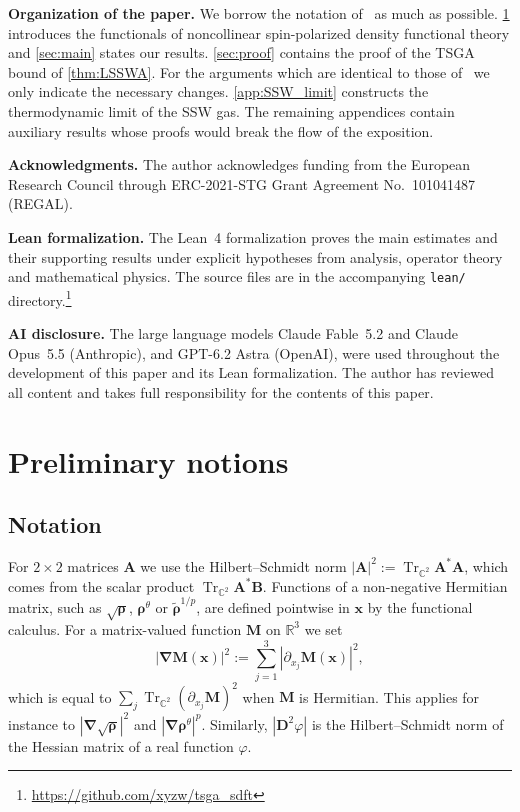 \documentclass[final,reqno]{amsart}
\theoremstyle{remark}
\newcommand{\wt}[1]{\widetilde{#1}}
\DeclareMathOperator{\Tr}{Tr}
\newcommand{\Trs}{\Tr_{\CC^2}}
\newcommand{\RR}{\mathbb{R}}
\newcommand{\CC}{\mathbb{C}}
\newcommand{\grad}{\bm{\nabla}}
\begin{document}
\medskip

\noindent\textbf{Organization of the paper.} We borrow the notation of~\cite{lewin2020local} as much as possible. \cref{sec:Prel} introduces the functionals of noncollinear spin-polarized density functional theory and \cref{sec:main} states our results. \cref{sec:proof} contains the proof of the TSGA bound of \cref{thm:LSSWA}. For the arguments which are identical to those of~\cite{lewin2020local} we only indicate the necessary changes. \cref{app:SSW_limit} constructs the thermodynamic limit of the SSW gas. The remaining appendices contain auxiliary results whose proofs would break the flow of the exposition.

\medskip

\noindent\textbf{Acknowledgments.} The author acknowledges funding from the European Research Council through ERC-2021-STG Grant Agreement No.~101041487 \mbox{(REGAL)}.

\medskip

\noindent\textbf{Lean formalization.} The Lean~4 formalization proves the main estimates and their supporting results under explicit hypotheses from analysis, operator theory and mathematical physics. The source files are in the accompanying \texttt{lean/} directory.\footnote{\url{https://github.com/xyzw/tsga_sdft}}\enlargethispage{2pt}

\medskip

\noindent\textbf{AI disclosure.} The large language models Claude Fable~5.2 and Claude Opus~5.5 (Anthropic), and GPT-6.2 Astra (OpenAI), were used throughout the development of this paper and its Lean formalization. The author has reviewed all content and takes full responsibility for the contents of this paper.

\clearpage
\section{Preliminary notions}\label{sec:Prel}

\subsection{Notation}\label{sec:notation}
For $2\times 2$ matrices $\mathbf{A}$ we use the Hilbert--Schmidt norm $|\mathbf{A}|^2:=\Trs\mathbf{A}^*\mathbf{A}$, which comes from the scalar product $\Trs\mathbf{A}^*\mathbf{B}$. Functions of a non-negative Hermitian matrix, such as $\sqrt{\bm{\rho}}$, $\bm{\rho}^\theta$ or $\wt{\bm{\rho}}^{1/p}$, are defined pointwise in $\mathbf{x}$ by the functional calculus. For a matrix-valued function $\mathbf{M}$ on $\RR^3$ we set
$$
|\grad\mathbf{M}(\mathbf{x})|^2:=\sum_{j=1}^3|\partial_{x_j}\mathbf{M}(\mathbf{x})|^2,
$$
which is equal to $\sum_j\Trs(\partial_{x_j}\mathbf{M})^2$ when $\mathbf{M}$ is Hermitian. This applies for instance to $|\grad\sqrt{\bm{\rho}}|^2$ and $|\grad\bm{\rho}^\theta|^p$. Similarly, $|\mathbf{D}^2\varphi|$ is the Hilbert--Schmidt norm of the Hessian matrix of a real function $\varphi$.
\end{document}
